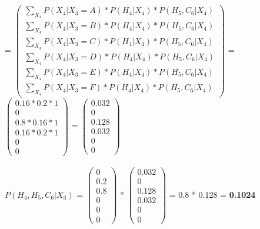 \documentclass{article}
\begin{document}
\indent
= $\left(\begin{array}{c} 
        \sum_{X_4} P(X_4 \vert X_3 = A) * P(H_4 \vert X_4) * P(H_5, C_6 \vert X_4)\\
        \sum_{X_4} P(X_4 \vert X_3 = B) * P(H_4 \vert X_4) * P(H_5, C_6 \vert X_4) \\ 
        \sum_{X_4} P(X_4 \vert X_3 = C) * P(H_4 \vert X_4) * P(H_5, C_6 \vert X_4) \\
        \sum_{X_4} P(X_4 \vert X_3 = D) * P(H_4 \vert X_4) * P(H_5, C_6 \vert X_4) \\
        \sum_{X_4} P(X_4 \vert X_3 = E) * P(H_4 \vert X_4) * P(H_5, C_6 \vert X_4) \\
        \sum_{X_4} P(X_4 \vert X_3 = F) * P(H_4 \vert X_4) * P(H_5, C_6 \vert X_4)
    \end{array}\right)$ 
= $\left(\begin{array}{c} 
        0.16*0.2*1\\
        0 \\ 
        0.8*0.16*1 \\
        0.16*0.2*1\\
        0 \\
        0
    \end{array}\right)$ = 
$\left(\begin{array}{c} 
        0.032\\
        0 \\ 
        0.128\\
        0.032\\
        0 \\
        0
    \end{array}\right)$ 
\\ 
\\ 

\noindent 
$P(H_4, H_5, C_6 \vert X_3)$ = 
$\left(\begin{array}{c} 
        0 \\
        0.2 \\ 
        0.8 \\
        0 \\
        0 \\
        0
    \end{array}\right)$ * 
$\left(\begin{array}{c} 
        0.032\\
        0 \\ 
        0.128\\
        0.032\\
        0 \\
        0
    \end{array}\right)$ 
= 0.8 * 0.128 = \textbf{0.1024} 
    
\end{document}
